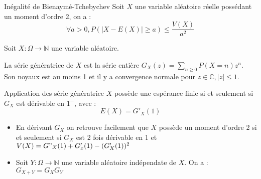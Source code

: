 \documentclass[french, a4paper, 10pt, twocolumn]{article}
\newcommand{\N}{\mathbb{N}}   %
\newcommand{\C}{\mathbb{C}}   %
\begin{document}
\begin{theoreme}{Inégalité de Bienaymé-Tchebychev}
    Soit $X$ une variable aléatoire réelle possédant un moment d'ordre 2, on a :
     \[\forall a>0, P(|X-E(X)|\geqslant a)\leqslant \frac{V(X)}{a^2}\]
\end{theoreme}

Soit \(X : \Omega \rightarrow \N\) une variable aléatoire.

\begin{definition}
    La série génératrice de \(X\) est la série entière \(G_X(z)=\sum_{n\geq 0}P(X=n)z^n\).
    Son noyaux est au moins 1 et il y a convergence normale pour \(z \in \C, |z|\leq 1\).
\end{definition}

\begin{theoreme}{Application des série génératrice}
    \(X\) possède une espérance finie si et seulement si \(G_X\) est dérivable en \(1^-\), avec :
        \[E(X)=G'_X(1)\]

    \tcblower
    \begin{itemize}
        \item En dérivant \(G_X\) on retrouve facilement que \(X\) possède un moment d'ordre 2 si et seulement si \(G_X\) est
        2 fois dérivable en 1 et \(V(X)=G"_X(1)+G'_x(1)-(G'_X(1))^2\)
        \item Soit \(Y : \Omega \rightarrow \N\) une variable aléatoire indépendate de \(X\). On a : \(G_{X+Y}=G_X G_Y\)
    \end{itemize}
\end{theoreme}
\end{document}
